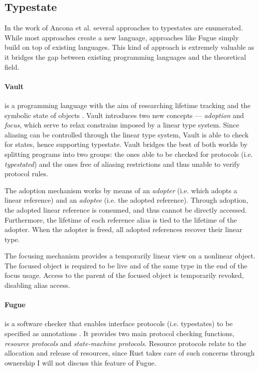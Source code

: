 \subsection{Typestate}
In the work of Ancona et al. \autocite[Section 2.3]{Ancona2016} several approaches to typestates are enumerated.
While most approaches create a new language,
approaches like Fugue \autocite{DeLine2004} simply build on top of existing languages.
This kind of approach is extremely valuable as it bridges the gap between existing programming languages and the theoretical field.

\paragraph{Vault} is a programming language with the aim of researching lifetime tracking and the symbolic state of objects \autocite{Fahndrich2002}.
Vault introduces two new concepts — \emph{adoption} and \emph{focus}, which serve to relax constrains imposed by a linear type system.
Since aliasing can be controlled through the linear type system, Vault is able to check for states, hence supporting typestate.
Vault bridges the best of both worlds by splitting programs into two groups:
the ones able to be checked for protocols (i.e. \emph{typestated}) and
the ones free of aliasing restrictions and thus unable to verify protocol rules.

The adoption mechanism works by means of an \emph{adopter} (i.e. which adopts a linear reference) and an \emph{adoptee} (i.e. the adopted reference).
Through adoption, the adopted linear reference is consumed, and thus cannot be directly accessed.
Furthermore, the lifetime of each reference alias is tied to the lifetime of the adopter.
When the adopter is freed, all adopted references recover their linear type.

The focusing mechanism provides a temporarily linear view on a nonlinear object.
The focused object is required to be live and of the same type in the end of the focus usage.
Access to the parent of the focused object is temporarily revoked, disabling alias access.

\paragraph{Fugue} is a software checker that enables interface protocols (i.e. typestates) to be specified as annotations \autocite{DeLine2004}.
It provides two main protocol checking functions, \emph{resource protocols} and \emph{state-machine protocols}.
Resource protocols relate to the allocation and release of resources,
since Rust takes care of such concerns through ownership I will not discuss this feature of Fugue.

